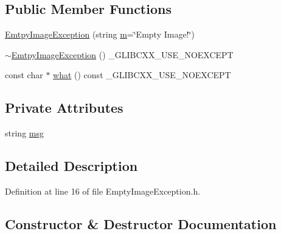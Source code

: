 \subsection*{Public Member Functions}
\begin{DoxyCompactItemize}
\item 
\hyperlink{class_vision_1_1_exception_1_1_emtpy_image_exception_ac5ffe210a9b0334c94b30960d4b4a3e8}{Emtpy\+Image\+Exception} (string \hyperlink{_gen_blob_8m_ab3cd915d758008bd19d0f2428fbb354a}{m}=\char`\"{}Empty Image!\char`\"{})
\item 
\hyperlink{class_vision_1_1_exception_1_1_emtpy_image_exception_a525fb499437fb7b2d8612118430549ec}{$\sim$\+Emtpy\+Image\+Exception} () \+\_\+\+G\+L\+I\+B\+C\+X\+X\+\_\+\+U\+S\+E\+\_\+\+N\+O\+E\+X\+C\+E\+P\+T
\item 
const char $\ast$ \hyperlink{class_vision_1_1_exception_1_1_emtpy_image_exception_a07ecf1da15bdf9d26b32ee9044b529f0}{what} () const \+\_\+\+G\+L\+I\+B\+C\+X\+X\+\_\+\+U\+S\+E\+\_\+\+N\+O\+E\+X\+C\+E\+P\+T
\end{DoxyCompactItemize}
\subsection*{Private Attributes}
\begin{DoxyCompactItemize}
\item 
string \hyperlink{class_vision_1_1_exception_1_1_emtpy_image_exception_a170fca455cf8c837ce36f26076d094c5}{msg}
\end{DoxyCompactItemize}


\subsection{Detailed Description}


Definition at line 16 of file Empty\+Image\+Exception.\+h.



\subsection{Constructor \& Destructor Documentation}
\hypertarget{class_vision_1_1_exception_1_1_emtpy_image_exception_ac5ffe210a9b0334c94b30960d4b4a3e8}{}
